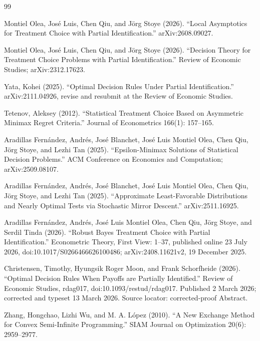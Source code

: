 \documentclass{article}
\begin{document}
\begin{thebibliography}{99}

   Montiel Olea, José Luis, Chen Qiu, and Jörg Stoye (2026). ``Local Asymptotics for Treatment Choice with Partial Identification.'' arXiv:2608.09027.

   Montiel Olea, José Luis, Chen Qiu, and Jörg Stoye (2026). ``Decision Theory for Treatment Choice Problems with Partial Identification.'' Review of Economic Studies; arXiv:2312.17623.

   Yata, Kohei (2025). ``Optimal Decision Rules Under Partial Identification.'' arXiv:2111.04926, revise and resubmit at the Review of Economic Studies.

   Tetenov, Aleksey (2012). ``Statistical Treatment Choice Based on Asymmetric Minimax Regret Criteria.'' Journal of Econometrics 166(1): 157--165.

   Aradillas Fernández, Andrés, José Blanchet, José Luis Montiel Olea, Chen Qiu, Jörg Stoye, and Lezhi Tan (2025). ``Epsilon-Minimax Solutions of Statistical Decision Problems.'' ACM Conference on Economics and Computation; arXiv:2509.08107.

   Aradillas Fernández, Andrés, José Blanchet, José Luis Montiel Olea, Chen Qiu, Jörg Stoye, and Lezhi Tan (2025). ``Approximate Least-Favorable Distributions and Nearly Optimal Tests via Stochastic Mirror Descent.'' arXiv:2511.16925.

   Aradillas Fernández, Andrés, José Luis Montiel Olea, Chen Qiu, Jörg Stoye, and Serdil Tinda (2026). ``Robust Bayes Treatment Choice with Partial Identification.'' Econometric Theory, First View: 1--37, published online 23 July 2026, doi:10.1017/S0266466626100486; arXiv:2408.11621v2, 19 December 2025.

   Christensen, Timothy, Hyungsik Roger Moon, and Frank Schorfheide (2026). ``Optimal Decision Rules When Payoffs are Partially Identified.'' Review of Economic Studies, rdag017, doi:10.1093/restud/rdag017. Published 2 March 2026; corrected and typeset 13 March 2026. Source locator: corrected-proof Abstract.

   Zhang, Hongchao, Lizhi Wu, and M. A. López (2010). ``A New Exchange Method for Convex Semi-Infinite Programming.'' SIAM Journal on Optimization 20(6): 2959--2977.


\end{thebibliography}
\end{document}
